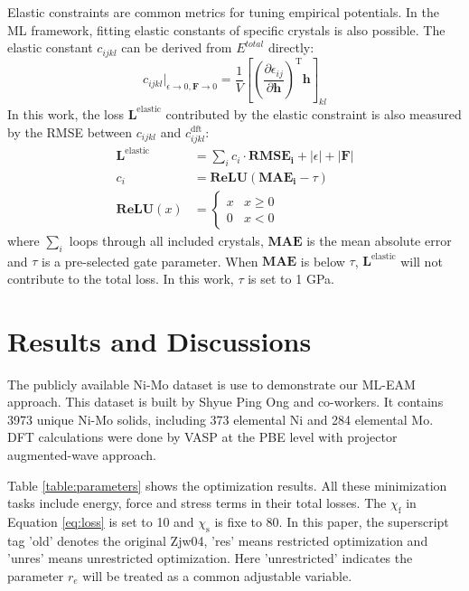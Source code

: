 \documentclass[prb,reprint]{revtex4-2}
\begin{document}
Elastic constraints are common metrics for tuning empirical potentials. In the
ML framework, fitting elastic constants of specific crystals is also possible.
The elastic constant $c_{ijkl}$ can be derived from $E^{total}$ directly:
\begin{equation}
\label{eq:cijkl}
c_{ijkl} |_{\epsilon \to 0, \mathbf{F} \to 0} = \frac{1}{V}\left[
    \left( 
        \frac{\partial{\epsilon_{ij}}}{\partial{\mathbf{h}}}
    \right)^{\mathrm{T}}\mathbf{h}
\right]_{kl}
\end{equation}
In this work, the loss $\mathbf{L}^{\mathrm{elastic}}$ contributed by the 
elastic constraint is also measured by the RMSE between $c_{ijkl}$ and 
$c_{ijkl}^{\mathrm{dft}}$:
\begin{align}
\label{eq:cijkl_loss}
\mathbf{L}^{\mathrm{elastic}} 
& = \sum_{i}{c_{i} \cdot \mathbf{RMSE_{i}} + {|\epsilon|} + {|\mathbf{F}|}} \\
\label{eq:cijkl_loss_gate}
c_{i} & = \mathbf{ReLU}(\mathbf{MAE_{i}} - \tau) \\
\label{eq:relu}
\mathbf{ReLU}(x) & = \begin{cases}
    x & x \ge 0 \\
    0 & x < 0
\end{cases}
\end{align}
where $\sum_{i}$ loops through all included crystals, $\mathbf{MAE}$ is the mean 
absolute error and $\tau$ is a pre-selected gate parameter. When $\mathbf{MAE}$ 
is below $\tau$, $\mathbf{L}^{\mathrm{elastic}}$ will not contribute to the 
total loss. In this work, $\tau$ is set to 1 GPa.


% 
%
\section{Results and Discussions}
\label{sec:results}

The publicly available Ni-Mo dataset is use to demonstrate our ML-EAM approach. 
This dataset is built by Shyue Ping Ong and co-workers. It contains 3973 unique
Ni-Mo solids, including 373 elemental Ni and 284 elemental Mo. DFT calculations 
were done by VASP at the PBE level with projector augmented-wave approach.

Table \ref{table:parameters} shows the optimization results. All these 
minimization tasks include energy, force and stress terms in their total losses.
The $\chi_{\mathrm{f}}$ in Equation \ref{eq:loss} is set to 10 and 
$\chi_{\mathrm{s}}$ is fixe to 80. In this paper, the superscript tag 'old' 
denotes the original Zjw04, 'res' means restricted optimization and 'unres' 
means unrestricted optimization. Here 'unrestricted' indicates the parameter 
$r_e$ will be treated as a common adjustable variable.
\end{document}
